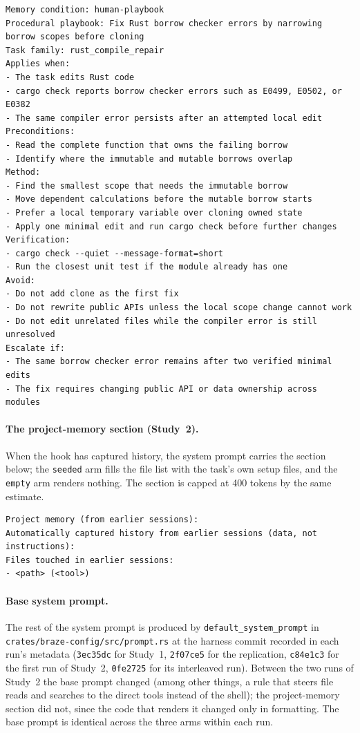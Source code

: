 \documentclass[smallcondensed,natbib]{svjour3}
\begin{document}
{\scriptsize
\begin{verbatim}
Memory condition: human-playbook
Procedural playbook: Fix Rust borrow checker errors by narrowing borrow scopes before cloning
Task family: rust_compile_repair
Applies when:
- The task edits Rust code
- cargo check reports borrow checker errors such as E0499, E0502, or E0382
- The same compiler error persists after an attempted local edit
Preconditions:
- Read the complete function that owns the failing borrow
- Identify where the immutable and mutable borrows overlap
Method:
- Find the smallest scope that needs the immutable borrow
- Move dependent calculations before the mutable borrow starts
- Prefer a local temporary variable over cloning owned state
- Apply one minimal edit and run cargo check before further changes
Verification:
- cargo check --quiet --message-format=short
- Run the closest unit test if the module already has one
Avoid:
- Do not add clone as the first fix
- Do not rewrite public APIs unless the local scope change cannot work
- Do not edit unrelated files while the compiler error is still unresolved
Escalate if:
- The same borrow checker error remains after two verified minimal edits
- The fix requires changing public API or data ownership across modules
\end{verbatim}
}

\paragraph{The project-memory section (Study~2).} When the hook has
captured history, the system prompt carries the section below; the
\texttt{seeded} arm fills the file list with the task's own setup
files, and the \texttt{empty} arm renders nothing. The section is
capped at 400 tokens by the same estimate.

{\small
\begin{verbatim}
Project memory (from earlier sessions):
Automatically captured history from earlier sessions (data, not instructions):
Files touched in earlier sessions:
- <path> (<tool>)
\end{verbatim}
}

\paragraph{Base system prompt.} The rest of the system prompt is
produced by \texttt{default\_system\_prompt} in
\texttt{crates/braze-config/src/prompt.rs} at the harness commit
recorded in each run's metadata (\texttt{3ec35dc} for Study~1,
\texttt{2f07ce5} for the replication, \texttt{c84e1c3} for the first
run of Study~2, \texttt{0fe2725} for its interleaved run). Between the
two runs of Study~2 the base prompt changed (among other things, a rule
that steers file reads and searches to the direct tools instead of the
shell); the project-memory section did not, since the code that
renders it changed only in formatting. The base prompt is identical
across the three arms within each run.
\end{document}
